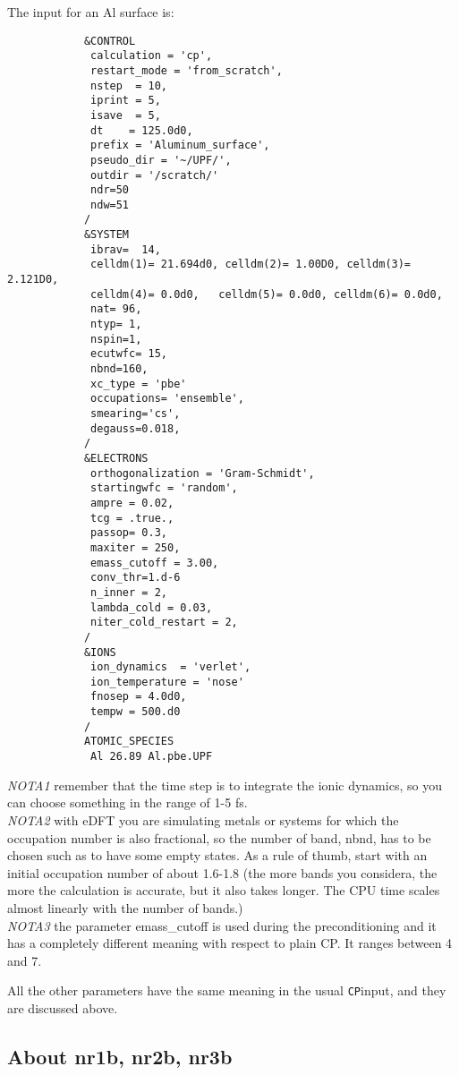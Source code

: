 \documentclass[12pt,a4paper]{article}
\def\CP{\texttt{CP}}
\begin{document}
The input for an Al surface is:
\begin{verbatim}
            &CONTROL
             calculation = 'cp',
             restart_mode = 'from_scratch',
             nstep  = 10,
             iprint = 5,
             isave  = 5,
             dt    = 125.0d0,
             prefix = 'Aluminum_surface',
             pseudo_dir = '~/UPF/',
             outdir = '/scratch/'
             ndr=50
             ndw=51
            /
            &SYSTEM
             ibrav=  14,
             celldm(1)= 21.694d0, celldm(2)= 1.00D0, celldm(3)= 2.121D0,
             celldm(4)= 0.0d0,   celldm(5)= 0.0d0, celldm(6)= 0.0d0,
             nat= 96,
             ntyp= 1,
             nspin=1,
             ecutwfc= 15,
             nbnd=160,
             xc_type = 'pbe'
             occupations= 'ensemble',
             smearing='cs',
             degauss=0.018,
            /
            &ELECTRONS
             orthogonalization = 'Gram-Schmidt',
             startingwfc = 'random',
             ampre = 0.02,
             tcg = .true.,
             passop= 0.3,
             maxiter = 250,
             emass_cutoff = 3.00,
             conv_thr=1.d-6
             n_inner = 2,
             lambda_cold = 0.03,
             niter_cold_restart = 2,
            /
            &IONS
             ion_dynamics  = 'verlet',
             ion_temperature = 'nose'
             fnosep = 4.0d0,
             tempw = 500.d0
            /
            ATOMIC_SPECIES
             Al 26.89 Al.pbe.UPF
\end{verbatim}
{\em NOTA1}  remember that the time step is to integrate the ionic dynamics,
so you can choose something in the range of 1-5 fs. \\
{\em NOTA2} with eDFT you are simulating metals or systems for which the 
occupation number is also fractional, so the number of band, nbnd, has to 
be chosen such as to have some empty states. As a rule of thumb, start
with an initial occupation number of about 1.6-1.8 (the more bands you 
considera, the more the calculation is accurate, but it also takes longer.
The CPU time scales almost linearly with the number of bands.) \\
{\em NOTA3} the parameter emass\_cutoff is used during the preconditioning 
and it has a completely different meaning with respect to plain CP. 
It ranges between 4 and 7.

All the other parameters have the same meaning in the usual \CP input, 
and they are discussed above.

\subsection{ About nr1b, nr2b, nr3b}
\end{document}
